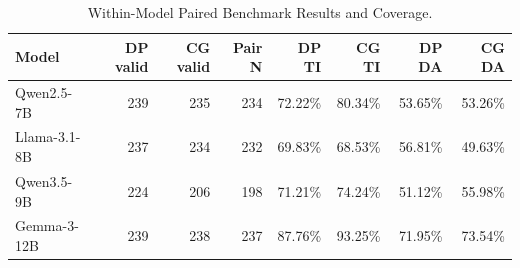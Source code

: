 \begin{table}[htbp]
\centering
\caption{Within-Model Paired Benchmark Results and Coverage.}
\label{tab:table7_within_model_paired}
\begin{tabular}{lrrrrrrr}
\toprule
Model & DP valid & CG valid & Pair N & DP TI & CG TI & DP DA & CG DA \\
\midrule
Qwen2.5-7B & 239 & 235 & 234 & 72.22\% & 80.34\% & 53.65\% & 53.26\% \\
Llama-3.1-8B & 237 & 234 & 232 & 69.83\% & 68.53\% & 56.81\% & 49.63\% \\
Qwen3.5-9B & 224 & 206 & 198 & 71.21\% & 74.24\% & 51.12\% & 55.98\% \\
Gemma-3-12B & 239 & 238 & 237 & 87.76\% & 93.25\% & 71.95\% & 73.54\% \\
\bottomrule
\end{tabular}
\end{table}
